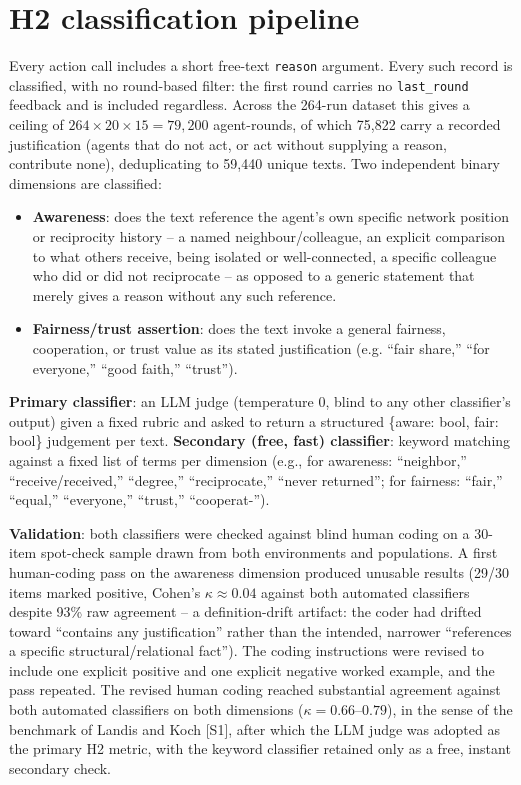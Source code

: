 \documentclass[11pt,a4paper]{article}
\newcommand{\code}[1]{\texttt{#1}}
\begin{document}
\section{H2 classification pipeline}
\label{sec:s5}

Every action call includes a short free-text \code{reason} argument.
Every such record is classified, with no round-based filter: the
first round carries no \code{last\_round} feedback and is included
regardless. Across the 264-run dataset this gives a ceiling of
$264 \times 20 \times 15 = 79{,}200$ agent-rounds, of which 75,822
carry a recorded justification (agents that do not act, or act without
supplying a reason, contribute none), deduplicating to 59,440 unique
texts. Two independent binary dimensions are classified:

\begin{itemize}[leftmargin=1.5em]
  \item \textbf{Awareness}: does the text reference the agent's own
  specific network position or reciprocity history -- a named
  neighbour/colleague, an explicit comparison to what others
  receive, being isolated or well-connected, a specific colleague who
  did or did not reciprocate -- as opposed to a generic statement that
  merely gives a reason without any such reference.
  \item \textbf{Fairness/trust assertion}: does the text invoke a
  general fairness, cooperation, or trust value as its stated
  justification (e.g. ``fair share,'' ``for everyone,'' ``good
  faith,'' ``trust'').
\end{itemize}

\textbf{Primary classifier}: an LLM judge (temperature 0, blind to any
other classifier's output) given a fixed rubric and asked to return a
structured \{aware: bool, fair: bool\} judgement per text.
\textbf{Secondary (free, fast) classifier}: keyword matching against a
fixed list of terms per dimension (e.g., for awareness: ``neighbor,''
``receive/received,'' ``degree,'' ``reciprocate,'' ``never
returned''; for fairness: ``fair,'' ``equal,'' ``everyone,''
``trust,'' ``cooperat-'').

\textbf{Validation}: both classifiers were checked against blind human
coding on a 30-item spot-check sample drawn from both environments and
populations. A first human-coding pass on the awareness dimension
produced unusable results (29/30 items marked positive, Cohen's
$\kappa \approx 0.04$ against both automated classifiers despite 93\%
raw agreement -- a definition-drift artifact: the coder had drifted
toward ``contains any justification'' rather than the intended,
narrower ``references a specific structural/relational fact''). The
coding instructions were revised to include one explicit positive and
one explicit negative worked example, and the pass repeated. The
revised human coding reached substantial agreement against both
automated classifiers on both dimensions ($\kappa=0.66$--$0.79$), in
the sense of the benchmark of Landis and Koch [S1], after which the
LLM judge was adopted as the
primary H2 metric, with the keyword classifier retained only as a
free, instant secondary check.
\end{document}
